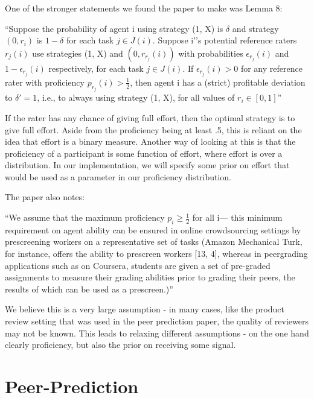 \documentclass{scrartcl}
\begin{document}
One of the stronger statements we found the paper to make was Lemma 8:
\begin{displayquote}
``Suppose the probability of agent i using strategy (1, X) is $\delta$ and strategy $(0, r_i)$ is $1-\delta$ for each task $j \in J(i)$. Suppose i'’s potential reference raters $r_j (i)$ use strategies (1, X) and $(0, r_{r_j} (i))$ with probabilities $\epsilon_{r_j}(i)$ and $1-\epsilon_{r_j}(i)$ respectively, for each task $j \in J(i)$. If $\epsilon_{r_j}(i) > 0$ for any reference rater with proficiency $p_{r_j} (i) > \frac{1}{2}$, then agent i has a (strict) profitable deviation to $\delta'=1$, i.e., to always using strategy (1, X), for all values of $r_i \in [0,1]$''
\end{displayquote}

If the rater has any chance of giving full effort, then the optimal strategy is to give full effort. Aside from the proficiency being at least .5, this is reliant on the idea that effort is a binary measure. Another way of looking at this is that the proficiency of a participant is some function of effort, where effort is over a distribution. In our implementation, we will specify some prior on effort that would be used as a parameter in our proficiency distribution.

The paper also notes: 

\begin{displayquote}
``We assume that the maximum proficiency $p_i \geq \frac{1}{2}$ for all i— this minimum requirement on agent ability can be ensured in online crowdsourcing settings by prescreening workers on a representative set of tasks (Amazon Mechanical Turk, for instance, offers the ability to prescreen workers [13, 4], whereas in peergrading applications such as on Coursera, students are given a set of pre-graded assignments to measure their grading abilities prior to grading their peers, the results of which can be used as a prescreen.)''
\end{displayquote}

We believe this is a very large assumption - in many cases, like the product review setting that was used in the peer prediction paper, the quality of reviewers may not be known. This leads to relaxing different assumptions - on the one hand clearly proficiency, but also the prior on receiving some signal.

\section{Peer-Prediction}
\end{document}
